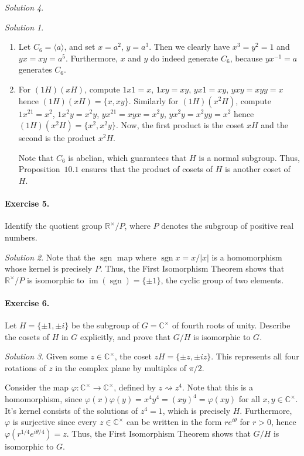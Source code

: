 \documentclass[11pt]{report}
\def\C{\mathbb{C}}
\def\R{\mathbb{R}}
\DeclareMathOperator\im{im}
\DeclareMathOperator\sgn{sgn}
\theoremstyle{remark}
\newtheorem*{solution}{Solution}
\begin{document}
\begin{solution}
\begin{solution}
\begin{enumerate}
        \item Let $C_6 = \langle a \rangle$, and set $x = a^2$, $y = a^3$. Then we
        clearly have $x^3 = y^2 = 1$ and $yx = xy = a^5$. Furthermore, $x$ and $y$ do
        indeed generate $C_6$, because $yx^{-1} = a$ generates $C_6$.

        \item For $(1H)(xH)$, compute $1x1 = x$, $1xy = xy$, $yx1 = xy$, $yxy = xy y
        = x$ hence $(1H)(xH) = \{x, xy\}$. Similarly for $(1H)(x^2H)$, compute $1x^21
        = x^2$, $1x^2y = x^2y$, $yx^21 = xyx = x^2y$, $yx^2y = x^2y y = x^2$ hence
        $(1H)(x^2H) = \{x^2, x^2y\}$. Now, the first product is the coset $xH$ and
        the second is the product $x^2H$.

        Note that $C_6$ is abelian, which guarantees that $H$ is a normal subgroup.
        Thus, Proposition~$10.1$ ensures that the product of cosets of $H$ is another
        coset of $H$.
    \end{enumerate}
    \end{solution}

    \paragraph{Exercise 5.} Identify the quotient group $\R^\times / P$, where $P$
    denotes the subgroup of positive real numbers.
    \begin{solution}
        Note that the $\sgn$ map where $\sgn{x} = x / |x|$ is a homomorphism whose
        kernel is precisely $P$. Thus, the First Isomorphism Theorem shows that
        $\R^\times /P$ is isomorphic to $\im(\sgn) = \{\pm 1\}$, the cyclic group of
        two elements.
    \end{solution}

    \paragraph{Exercise 6.} Let $H = \{\pm 1, \pm i\}$ be the subgroup of $G =
    \C^\times$ of fourth roots of unity. Describe the cosets of $H$ in $G$
    explicitly, and prove that $G / H$ is isomorphic to $G$.
    \begin{solution}
        Given some $z \in \C^\times$, the coset $zH = \{\pm z, \pm iz\}$. This
        represents all four rotations of $z$ in the complex plane by multiples of
        $\pi / 2$.

        Consider the map $\varphi\colon \C^\times \to \C^\times$, defined by $z
        \rightsquigarrow z^4$. Note that this is a homomorphism, since
        $\varphi(x)\varphi(y) = x^4y^4 = (xy)^4 = \varphi(xy)$ for all $x, y \in
        \C^\times$. It's kernel consists of the solutions of $z^4 = 1$, which is
        precisely $H$. Furthermore, $\varphi$ is surjective since every $z \in
        \C^\times$ can be written in the form $re^{i\theta}$ for $r > 0$, hence
        $\varphi(r^{1 / 4}e^{i\theta / 4}) = z$. Thus, the First Isomorphism Theorem
        shows that $G / H$ is isomorphic to $G$.
    \end{solution}


\end{solution}
\end{document}
